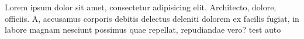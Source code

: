 Lorem ipsum dolor sit amet, consectetur adipisicing elit. Architecto, dolore, officiis. A, accusamus corporis debitis delectus deleniti dolorem ex facilis fugiat, in labore magnam nesciunt possimus quae repellat, repudiandae vero?
test
auto